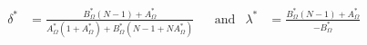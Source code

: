 \documentclass[12pt]{article}
\DeclareMathOperator*{\argmax}{arg\,max}
\theoremstyle{definition}
\theoremstyle{definition}
\begin{document}
\begin{align*}
\delta^* &= \frac{B_\Omega^*(N-1) + A_\Omega^*}{A_\Omega^*(1+A_\Omega^*) + B_\Omega^*(N-1+NA_\Omega^*)} &&\text{and}&
\lambda^* &= \frac{B_\Omega^*(N-1) + A_\Omega^*}{-B_\Omega^*}
\end{align*}


\end{document}
